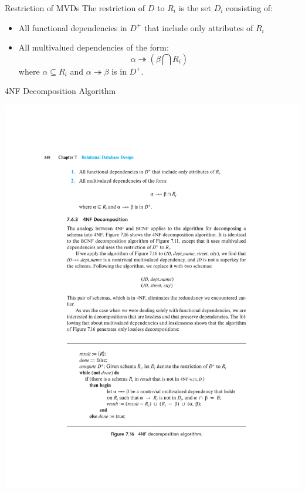 \documentclass{beamer}
\begin{document}
\begin{frame}{Restriction of MVDs}
    The restriction of $D$ to $R_i$ is the set $D_i$ consisting of:
        \begin{itemize}
            \item All functional dependencies in $D^+$ that include only attributes of $R_i$
            \item All multivalued dependencies of the form:
                $$
                    \alpha \twoheadrightarrow (\beta \bigcap R_i)
                $$
                where $\alpha \subseteq R_i$ and $\alpha \twoheadrightarrow \beta$ is in $D^+$.
        \end{itemize}
\end{frame}

\begin{frame}{4NF Decomposition Algorithm}
    \begin{center}
        \includegraphics[width=\textwidth, trim={4.5cm 3.5cm 4cm 16.75cm}, clip]{figures/p340_Decomposition_4NF}
    \end{center}
\end{frame}
\end{document}
